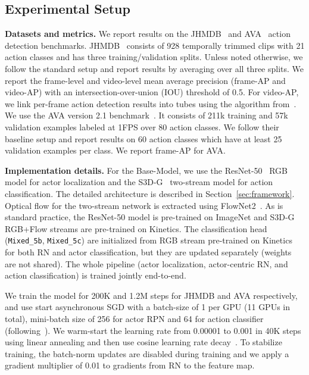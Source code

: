 \documentclass[runningheads]{llncs}
\newcommand{\mixed}[1]{\texttt{Mixed\_#1}}
\begin{document}
\subsection{Experimental Setup}
\medskip\noindent\textbf{Datasets and metrics.} We report results on the JHMDB~\cite{jhmdb} and AVA~\cite{ava_cvpr18} action detection benchmarks. JHMDB~\cite{jhmdb} consists of 928 temporally trimmed clips with 21 action classes and has three training/validation splits. Unless noted otherwise, we follow the standard setup and report results by averaging over all three splits. We report the frame-level and video-level mean average precision (frame-AP and video-AP) with an intersection-over-union (IOU) threshold of 0.5. For video-AP, we link per-frame action detection results into tubes using the algorithm from~\cite{ava_cvpr18}. We use the AVA version 2.1 benchmark~\cite{ava_cvpr18}. It consists of 211k training and 57k validation examples labeled at 1FPS over 80 action classes. We follow their baseline setup and report results on 60 action classes which have at least 25 validation examples per class. We report frame-AP for AVA.

\medskip\noindent\textbf{Implementation details.} 
For the Base-Model, we use the ResNet-50~\cite{he2016resnet} RGB model for actor localization and the S3D-G~\cite{s3dg_2017} two-stream model for action classification. The detailed architecture is described in Section~\ref{sec:framework}. Optical flow for the two-stream network is extracted using FlowNet2~\cite{flownet2}. As is standard practice, the ResNet-50 model is pre-trained on ImageNet and S3D-G RGB+Flow streams are pre-trained on Kinetics. The classification head (\mixed{5b}, \mixed{5c}) are initialized from RGB stream pre-trained on Kinetics for both RN and actor classification, but they are updated separately (weights are not shared). The whole pipeline (actor localization, actor-centric RN, and action classification) is trained jointly end-to-end. 

We train the model for 200K and 1.2M steps for JHMDB and AVA respectively, and use start asynchronous SGD with a batch-size of 1 per GPU (11 GPUs in total), mini-batch size of 256 for actor RPN and 64 for action classifier (following~\cite{ava_cvpr18}). We warm-start the learning rate from 0.00001 to 0.001 in 40K steps using linear annealing and then use cosine learning rate decay~\cite{cosine_lr}. To stabilize training, the batch-norm updates are disabled during training and we apply a gradient multiplier of 0.01 to gradients from RN to the feature map.
\end{document}
